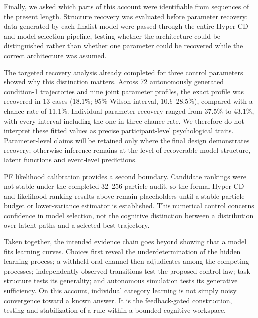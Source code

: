 Finally, we asked which parts of this account were identifiable from sequences
of the present length. Structure recovery was evaluated before parameter
recovery: data generated by each finalist model were passed through the entire
Hyper-CD and model-selection pipeline, testing whether the architecture could
be distinguished rather than whether one parameter could be recovered while
the correct architecture was assumed.

The targeted recovery analysis already completed for three control parameters
showed why this distinction matters. Across 72 autonomously generated
condition-1 trajectories and nine joint parameter profiles, the exact profile
was recovered in 13 cases (18.1\%; 95\% Wilson interval, 10.9--28.5\%), compared
with a chance rate of 11.1\%. Individual-parameter recovery ranged from 37.5\%
to 43.1\%, with every interval including the one-in-three chance rate. We
therefore do not interpret these fitted values as precise participant-level
psychological traits. Parameter-level claims will be retained only where the
final design demonstrates recovery; otherwise inference remains at the level
of recoverable model structure, latent functions and event-level predictions.

PF likelihood calibration provides a second boundary. Candidate rankings were
not stable under the completed 32--256-particle audit, so the formal Hyper-CD
and likelihood-ranking results above remain placeholders until a stable
particle budget or lower-variance estimator is established. This numerical
control concerns confidence in model selection, not the cognitive distinction
between a distribution over latent paths and a selected best trajectory.

Taken together, the intended evidence chain goes beyond showing that a model
fits learning curves. Choices first reveal the underdetermination of the hidden
learning process; a withheld oral channel then adjudicates among the competing
processes; independently observed transitions test the proposed control law;
task structure tests its generality; and autonomous simulation tests its
generative sufficiency. On this account, individual category learning is not
simply noisy convergence toward a known answer. It is the feedback-gated
construction, testing and stabilization of a rule within a bounded cognitive
workspace.
